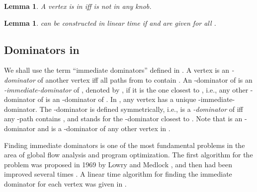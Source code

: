\documentclass[review]{elsarticle}
\def\squarebox#1{\hbox to #1{\hfill\vbox to #1{\vfill}}}
\renewcommand{\qed}{\hspace*{\fill}
            \vbox{\hrule\hbox{\vrule\squarebox{.667em}\vrule}\hrule}\smallskip\newline}
\newtheorem{lem}[thm]{Lemma}
\begin{document}
\begin{lem}\label{D+}
A vertex  is in  iff  is not in any knob.
\end{lem}

\begin{lem}
 can be constructed in linear time if  and  are
given for all .
\end{lem}

\subsection{Dominators in }

We shall use the term ``immediate dominators'' defined in
\cite{als99}. A vertex  is an {\em -dominator} of
another vertex  iff all paths from  to  contain . An
-dominator  of  is an \emph{-immediate-dominator} of
, denoted by , if it is the one closest to , i.e., any
other -dominator of  is an -dominator of . In
, any vertex has a unique -immediate-dominator. The
-dominator is defined symmetrically, i.e.,  is a {\em
-dominator} of  iff any -path contains , and 
stands for the -dominator closest to . Note that  is an
-dominator and  is a -dominator of any other vertex in
.

Finding immediate dominators is one of the most fundamental problems
in the area of global flow analysis and program optimization. The
first algorithm for the problem was proposed in 1969 by Lowry and
Medlock \cite{lor69}, and then had been improved several times
\cite{har85,len79,pur72,tar74}. A linear time algorithm for finding
the immediate dominator for each vertex was given in \cite{als99}.
\end{document}

